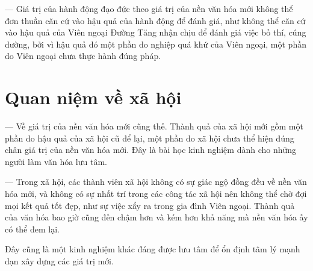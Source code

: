 — Giá trị của hành động đạo đức theo giá trị của nền văn hóa mới không thể đơn thuần căn cứ vào hậu quả của hành động để đánh giá, như không thể căn cứ vào hậu quả của Viên ngoại Đường Tăng nhận chịu để đánh giá việc bố thí, cúng dường, bởi vì hậu quả đó một phần do nghiệp quá khứ của Viên ngoại, một phần do Viên ngoại chưa thực hành đúng pháp.

\section{Quan niệm về xã hội} %
\label{sec:96_97_xa_hoi}

— Về giá trị của nền văn hóa mới cũng thế. Thành quả của xã hội mới gồm một phần do hậu quả của xã hội cũ để lại, một phần do xã hội chưa thể hiện đúng chân giá trị của nền văn hóa mới. Đây là bài học kinh nghiệm dành cho những người làm văn hóa lưu tâm.

— Trong xã hội, các thành viên xã hội không có sự giác ngộ đồng đều về nền văn hóa mới, và không có sự nhất trí trong các công tác xã hội nên không thể chờ đợi mọi kết quả tốt đẹp, như sự việc xẩy ra trong gia đình Viên ngoại. Thành quả của văn hóa bao giờ cũng đến chậm hơn và kém hơn khả năng mà nền văn hóa ấy có thể đem lại.

Đây cũng là một kinh nghiệm khác đáng được lưu tâm để ổn định tâm lý mạnh dạn xây dựng các giá trị mới.
